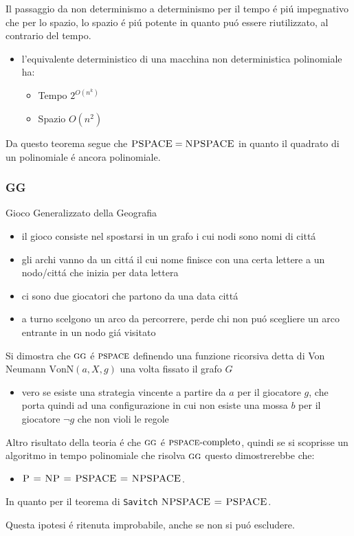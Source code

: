 \documentclass[
                        12pt, %
                        a4paper, %
                        oneside, %
                        headinclude,footinclude, %
                        BCOR5mm, %
                  ]{scrartcl}
\begin{document}
Il passaggio da non determinismo a determinismo per il tempo é piú impegnativo che per lo spazio, lo spazio é piú potente in quanto puó essere riutilizzato, al contrario del tempo.
\begin{itemize}
\item l'equivalente deterministico di una macchina non deterministica polinomiale ha:
\begin{itemize}
\item Tempo \(2^{O(n^k)}\)
\item Spazio \(O(n^2)\)
\end{itemize}
\end{itemize}

Da questo teorema segue che \(\textsc{PSPACE} =  \textsc{NPSPACE}\) in quanto il quadrato di un polinomiale é ancora polinomiale.
\subsubsection{GG}
\label{sec:orgdf6d73d}
Gioco Generalizzato della Geografia
\begin{itemize}
\item il gioco consiste nel spostarsi in un grafo i cui nodi sono nomi di cittá
\item gli archi vanno da un cittá il cui nome finisce con una certa lettere a un nodo/cittá che inizia per data lettera
\item ci sono due giocatori che partono da una data cittá
\item a turno scelgono un arco da percorrere, perde chi non puó scegliere un arco entrante in un nodo giá visitato
\end{itemize}

Si dimostra che \(\textsc{gg}\) é \(\textsc{pspace}\) definendo una funzione ricorsiva detta di Von Neumann \(\text{VonN}(a,X,g)\) una volta fissato il grafo \(G\)
\begin{itemize}
\item vero se esiste una strategia vincente a partire da \(a\) per il giocatore \(g\), che porta quindi ad una configurazione in cui non esiste una mossa \(b\) per il giocatore \(\lnot g\) che non violi le regole
\end{itemize}

Altro risultato della teoria é che \(\textsc{gg}\) é \(\textsc{pspace}\text{-completo}\), quindi se si scoprisse un algoritmo in tempo polinomiale che risolva \(\textsc{gg}\) questo dimostrerebbe che:
\begin{itemize}
\item \(\textsc{P = NP = PSPACE = NPSPACE}\).
\end{itemize}

In quanto per il teorema di \texttt{Savitch} \(\textsc{NPSPACE = PSPACE}\).

Questa ipotesi é ritenuta improbabile, anche se non si puó escludere.
\end{document}
